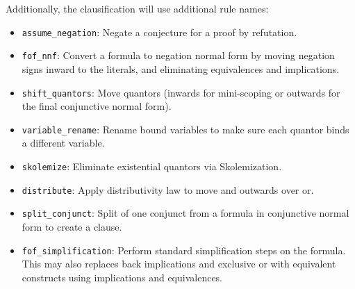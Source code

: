 \documentclass[a4paper, 11pt]{article}
\begin{document}
Additionally, the clausification will use additional rule names:

\begin{itemize}
\item \texttt{assume\_negation}:
  Negate a conjecture for a proof by refutation. 

\item \texttt{fof\_nnf}:
  Convert a formula to negation normal form by moving negation signs inward to
  the literals, and eliminating equivalences and implications.

\item \texttt{shift\_quantors}:
  Move quantors (inwards for mini-scoping or outwards for the final conjunctive
  normal form).

\item \texttt{variable\_rename}:
  Rename bound variables to make sure each quantor binds a different variable.

\item \texttt{skolemize}:
  Eliminate existential quantors via Skolemization. 

\item \texttt{distribute}:
  Apply distributivity law to move and outwards over or.

\item \texttt{split\_conjunct}:
  Split of one conjunct from a formula in conjunctive normal form to create a
  clause.

\item \texttt{fof\_simplification}:
  Perform standard simplification steps on the formula. This may also replaces
  back implications and exclusive or with equivalent constructs using
  implications and equivalences.

\end{itemize}
\end{document}
